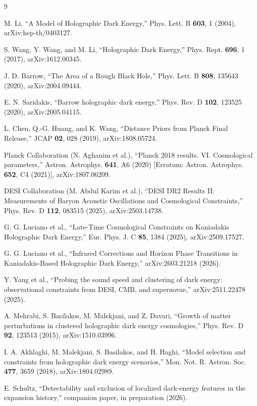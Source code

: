 \documentclass[twocolumn,10pt]{article}
\begin{document}
\begin{thebibliography}{9}

 M. Li, ``A Model of Holographic Dark Energy,''
Phys. Lett. B \textbf{603}, 1 (2004), arXiv:hep-th/0403127.

 S. Wang, Y. Wang, and M. Li, ``Holographic Dark Energy,''
Phys. Rept. \textbf{696}, 1 (2017), arXiv:1612.00345.

 J. D. Barrow, ``The Area of a Rough Black Hole,''
Phys. Lett. B \textbf{808}, 135643 (2020), arXiv:2004.09444.

 E. N. Saridakis, ``Barrow holographic dark energy,''
Phys. Rev. D \textbf{102}, 123525 (2020), arXiv:2005.04115.

 L. Chen, Q.-G. Huang, and K. Wang,
``Distance Priors from Planck Final Release,''
JCAP \textbf{02}, 028 (2019), arXiv:1808.05724.

 Planck Collaboration (N. Aghanim et al.),
``Planck 2018 results. VI. Cosmological parameters,''
Astron. Astrophys. \textbf{641}, A6 (2020)
[Erratum: Astron. Astrophys. \textbf{652}, C4 (2021)], arXiv:1807.06209.

 DESI Collaboration (M. Abdul Karim et al.),
``DESI DR2 Results II: Measurements of Baryon Acoustic Oscillations
and Cosmological Constraints,'' Phys. Rev. D \textbf{112}, 083515 (2025),
arXiv:2503.14738.

 G. G. Luciano et al., ``Late-Time Cosmological
Constraints on Kaniadakis Holographic Dark Energy,''
Eur. Phys. J. C \textbf{85}, 1384 (2025), arXiv:2509.17527.

 G. G. Luciano et al., ``Infrared Corrections and
Horizon Phase Transitions in Kaniadakis-Based Holographic Dark Energy,''
arXiv:2603.21218 (2026).

 Y. Yang et al., ``Probing the sound speed and clustering
of dark energy: observational constraints from DESI, CMB, and supernovae,''
arXiv:2511.22478 (2025).

 A. Mehrabi, S. Basilakos, M. Malekjani, and Z. Davari,
``Growth of matter perturbations in clustered holographic dark energy
cosmologies,'' Phys. Rev. D \textbf{92}, 123513 (2015), arXiv:1510.03996.

 I. A. Akhlaghi, M. Malekjani, S. Basilakos, and H. Haghi,
``Model selection and constraints from holographic dark energy scenarios,''
Mon. Not. R. Astron. Soc. \textbf{477}, 3659 (2018), arXiv:1804.02989.

 E. Schultz, ``Detectability and exclusion of localized
dark-energy features in the expansion history,'' companion paper,
in preparation (2026).

\end{thebibliography}
\end{document}
